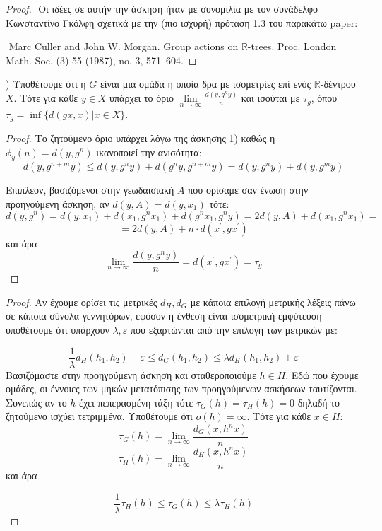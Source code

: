 \documentclass[oneside,a4paper]{article}
\newcommand {\tl}{\textlatin}
\begin{document}
\begin{proof}
	$ $\newline
	Οι ιδέες σε αυτήν την άσκηση ήταν με συνομιλία με τον συνάδελφο Κωνσταντίνο Γκόλφη σχετικά με την (πιο ισχυρή) πρόταση 1.3 του παρακάτω \tl{paper}:
	
	$ $\newline
	\tl{Marc Culler and John W. Morgan. Group actions on }$\mathbb{R}$-\tl{trees. Proc. London Math. Soc. (3) 55 (1987), no. 3, 571–604.}

\end{proof}

\pagebreak

) Υποθέτουμε ότι η $G$ είναι μια ομάδα η οποία δρα με ισομετρίες επί ενός $\mathbb{R}$-δέντρου $X$. Τότε για κάθε $y \in X$ υπάρχει το όριο $\lim\limits_{n\rightarrow \infty} \frac{d(y,g^ny)}{n}$ και ισούται με $\tau_g$, όπου $\tau_g = \inf\{d(gx,x)| x \in X\}$.

\begin{proof}
	Το ζητούμενο όριο υπάρχει λόγω της άσκησης 1) καθώς η $\phi_y(n) = d(y,g^n)$ ικανοποιεί την ανισότητα:
	$$d(y,g^{n+m}y) \leq d(y,g^ny) + d(g^ny,g^{n+m}y) = d(y,g^ny) + d(y,g^my)$$

	Επιπλέον, βασιζόμενοι στην γεωδαισιακή $A$ που ορίσαμε σαν ένωση στην προηγούμενη άσκηση, αν $d(y,A) = d(y,x_1)$ τότε:
	$$d(y,g^n) = d(y,x_1) + d(x_1,g^nx_1) + d(g^nx_1,g^n y) = 2d(y,A) + d(x_1,g^nx_1) = $$
	$$ = 2d(y,A) + n \cdot d(x^{\prime},gx^{\prime})$$ και άρα
	$$\lim\limits_{n\rightarrow \infty} \frac{d(y,g^ny)}{n} = d(x^{\prime},gx^{\prime}) = \tau_g$$
\end{proof}

\pagebreak

\begin{proof} Αν έχουμε ορίσει τις μετρικές $d_H, d_G$ με κάποια επιλογή μετρικής λέξεις πάνω σε κάποια σύνολα γεννητόρων, εφόσον η ένθεση είναι ισομετρική εμφύτευση υποθέτουμε ότι υπάρχουν $\lambda,\varepsilon$ που εξαρτώνται από την επιλογή των μετρικών με:

	$$\frac{1}{\lambda}d_H(h_1,h_2) - \varepsilon \leq d_G(h_1,h_2) \leq \lambda d_H(h_1,h_2) + \varepsilon$$ Βασιζόμαστε στην προηγούμενη άσκηση και σταθεροποιούμε $h \in H$. Εδώ που έχουμε ομάδες, οι έννοιες των μηκών μετατόπισης των προηγούμενων ασκήσεων ταυτίζονται. Συνεπώς αν το $h$ έχει πεπερασμένη τάξη τότε $\tau_G(h) = \tau_H(h) = 0$ δηλαδή το ζητούμενο ισχύει τετριμμένα. Υποθέτουμε ότι $o(h) = \infty$. Τότε για κάθε $x \in H$:
	$$\tau_G(h) = \lim_{n\rightarrow\infty}\frac{d_G(x,h^nx)}{n}$$ 
	$$\tau_H(h) = \lim_{n\rightarrow\infty}\frac{d_H(x,h^nx)}{n}$$ και άρα 

	$$\frac{1}{\lambda}\tau_H(h) \leq \tau_G(h) \leq \lambda \tau_H(h)$$
\end{proof}
\end{document}
